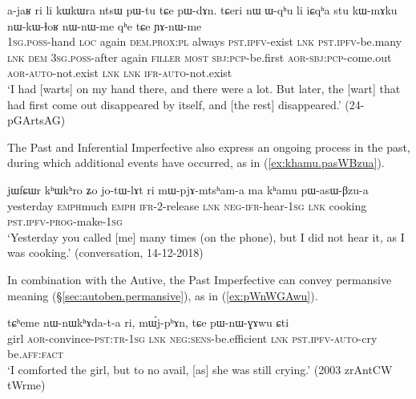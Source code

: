 \begin{exe}
\ex \label{ex:pWtu.pWdAn}
\gll a-jaʁ ri li kɯkɯra ntsɯ pɯ-tu tɕe pɯ-dɤn. tɕeri nɯ ɯ-qʰu li iɕqʰa stu kɯ-mɤku nɯ-kɯ-ɬoʁ nɯ-nɯ-me qʰe tɕe ɲɤ-nɯ-me \\
\textsc{1sg}.\textsc{poss}-hand \textsc{loc} again \textsc{dem}.\textsc{prox}:\textsc{pl} always \textsc{pst}.\textsc{ipfv}-exist \textsc{lnk} \textsc{pst}.\textsc{ipfv}-be.many \textsc{lnk} \textsc{dem} \textsc{3sg}.\textsc{poss}-after again \textsc{filler} \textsc{most} \textsc{sbj}:\textsc{pcp}-be.first \textsc{aor}-\textsc{sbj}:\textsc{pcp}-come.out \textsc{aor}-\textsc{auto}-not.exist \textsc{lnk} \textsc{lnk} \textsc{ifr}-\textsc{auto}-not.exist \\
\glt `I had [warts] on my hand there, and there were a lot. But later, the [wart] that had first come out disappeared by itself, and [the rest] disappeared.' (24-pGArtsAG)
\end{exe}

The Past and Inferential Imperfective also express an ongoing process in the past, during which additional events have occurred, as in (\ref{ex:khamu.pasWBzua}).

\begin{exe}
\ex \label{ex:khamu.pasWBzua}
\gll jɯfɕɯr kʰɯ\redp{}kʰro ʑo jo-tɯ-lɤt ri mɯ-pjɤ-mtsʰam-a ma kʰamu pɯ-asɯ-βzu-a   \\
yesterday \textsc{emph}\redp{}much \textsc{emph} \textsc{ifr}-2-release \textsc{lnk} \textsc{neg}-\textsc{ifr}-hear-\textsc{1sg} \textsc{lnk} cooking \textsc{pst}.\textsc{ipfv}-\textsc{prog}-make-\textsc{1sg} \\
\glt `Yesterday you called [me] many times (on the phone), but I did not hear it, as I was cooking.' (conversation, 14-12-2018)
\end{exe}


In combination with the Autive, the Past Imperfective can convey permansive meaning (§\ref{sec:autoben.permansive}), as in (\ref{ex:pWnWGAwu}).

\begin{exe}
\ex \label{ex:pWnWGAwu}
\gll tɕʰeme nɯ-nɯkʰɤda-t-a ri, mɯ́j-pʰɤn, tɕe pɯ-nɯ-ɣɤwu ɕti \\
girl \textsc{aor}-convince-\textsc{pst}:\textsc{tr}-\textsc{1sg} \textsc{lnk} \textsc{neg}:\textsc{sens}-be.efficient \textsc{lnk} \textsc{pst}.\textsc{ipfv}-\textsc{auto}-cry be.\textsc{aff}:\textsc{fact} \\
\glt `I comforted the girl, but to no avail, [as] she was still crying.' (2003 zrAntCW tWrme)
\end{exe}

